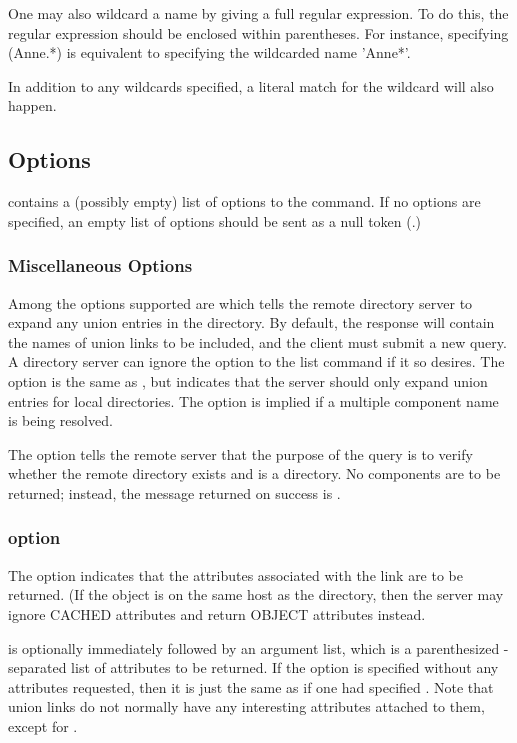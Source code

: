 One may also wildcard a name by giving a full regular expression.  To
do this, the regular expression should be enclosed within parentheses.
For instance, specifying (Anne.*) is equivalent to specifying the
wildcarded name 'Anne*'.  

In addition to any wildcards specified, a literal match for the
wildcard will also happen.

\subsection{Options}

 contains a (possibly empty) list of options to the
 command.  If no options are specified, an empty
list of options should be sent as
a null token (.)

\subsubsection{Miscellaneous Options}

Among the options supported are  which tells the remote directory
server to expand any union entries in the directory.  By default, the
response will contain the names of union links to be included, and the
client must submit a new query.  A directory server can ignore the
 option to the list command if it so desires.  The 
option is the same as , but indicates that the server should
only expand union entries for local directories.  The  option
is implied if a multiple component name is being resolved.

The  option tells the remote server that the purpose of the
query is to verify whether the remote directory exists and is a
directory.  No components are to be returned; instead, the message
returned on success is .

\subsubsection{\protect{} option}

The  option indicates that the attributes associated with
the link are to be returned.  (If the object is on the same host as
the directory, then the server may ignore CACHED attributes and return
OBJECT attributes instead.

   is optionally immediately
followed by an argument list, which is a parenthesized \mbox{\lit{+}-se}para\-ted
list of attributes to be 
returned.  If the  option is specified without any
attributes requested, then it is just the same as if one had specified
.  Note that union links do not
normally have any interesting attributes attached to them, except
for .

